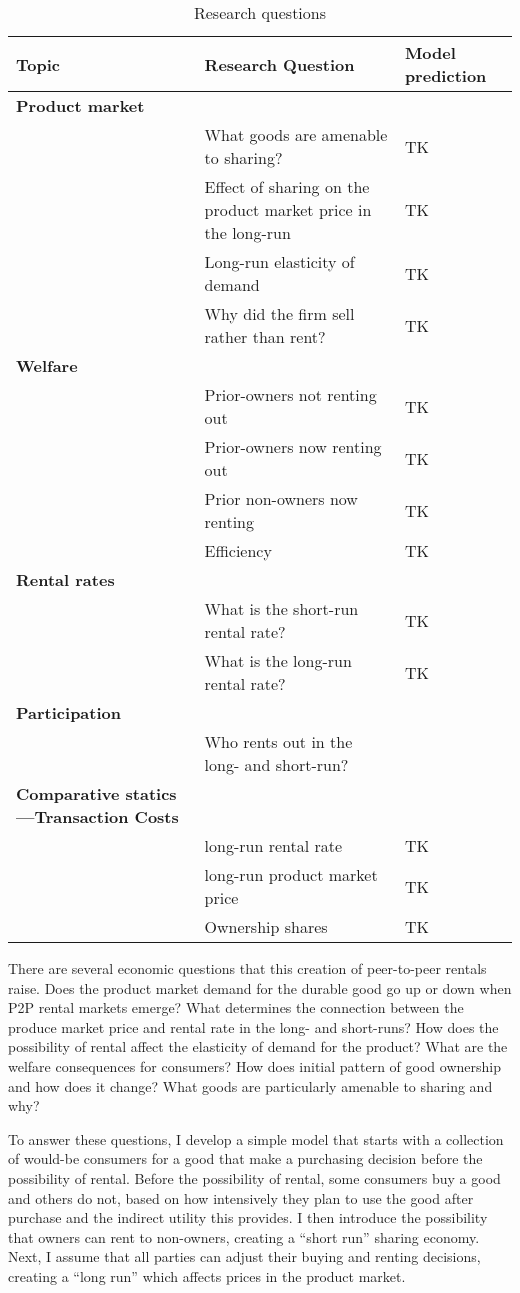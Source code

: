 \documentclass[11pt]{article}
\begin{document}
\begin{table}
\caption{Research questions}
\centering
{\footnotesize 
\begin{tabular}{llp{8cm}} 
\toprule
Topic & Research Question & Model prediction \\ 
\hline 
{\bf Product market} \\ 
& What goods are amenable to sharing? & TK \\ 
& Effect of sharing on the product market price in the long-run & TK \\
& Long-run elasticity of demand & TK \\ 
& Why did the firm sell rather than rent? & TK \\    
{\bf Welfare} \\ 
& Prior-owners not renting out & TK \\ 
& Prior-owners now renting out & TK \\ 
& Prior non-owners now renting & TK \\
& Efficiency & TK \\ 
{\bf Rental rates} \\
& What is the short-run rental rate? & TK \\
& What is the long-run rental rate?  & TK \\ 
{\bf Participation} \\ 
& Who rents out in the long- and short-run? \\ 
{\bf Comparative statics---Transaction Costs} \\ 
& long-run rental rate & TK \\ 
& long-run product market price & TK \\ 
& Ownership shares & TK \\ 
\bottomrule
\end{tabular}  
}
\end{table}


There are several economic questions that this creation of peer-to-peer rentals raise. 
Does the product market demand for the durable good go up or down when P2P rental markets emerge?  
What determines the connection between the produce market price and rental rate in the long- and short-runs? 
How does the possibility of rental affect the elasticity of demand for the product? 
What are the welfare consequences for consumers? 
How does initial pattern of good ownership and how does it change? 
What goods are particularly amenable to sharing and why?  

To answer these questions, I develop a simple model that starts with a collection of would-be consumers for a good that make a purchasing decision before the possibility of rental.
Before the possibility of rental, some consumers buy a good and others do not, based on how intensively they plan to use the good after purchase and the indirect utility this provides.  
I then introduce the possibility that owners can rent to non-owners, creating a ``short run'' sharing economy. 
Next, I assume that all parties can adjust their buying and renting decisions, creating a ``long run'' which affects prices in the product market. 
\end{document}
